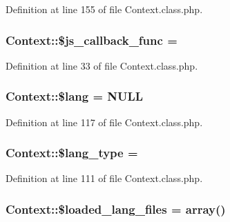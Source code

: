 Definition at line 155 of file Context.\+class.\+php.

\hypertarget{classContext_afddd5e6374a20b88466dfd1cb6f32d62}{}
\subsubsection[{\$js\+\_\+callback\+\_\+func}]{\setlength{\rightskip}{0pt plus 5cm}Context\+::\$js\+\_\+callback\+\_\+func = \textquotesingle{}\textquotesingle{}}\label{classContext_afddd5e6374a20b88466dfd1cb6f32d62}


Definition at line 33 of file Context.\+class.\+php.

\hypertarget{classContext_a0771720dad655d0c53f6f31066c67a40}{}
\subsubsection[{\$lang}]{\setlength{\rightskip}{0pt plus 5cm}Context\+::\$lang = N\+U\+L\+L}\label{classContext_a0771720dad655d0c53f6f31066c67a40}


Definition at line 117 of file Context.\+class.\+php.

\hypertarget{classContext_a170ac1b95c16b53af329395df9376e9f}{}
\subsubsection[{\$lang\+\_\+type}]{\setlength{\rightskip}{0pt plus 5cm}Context\+::\$lang\+\_\+type = \textquotesingle{}\textquotesingle{}}\label{classContext_a170ac1b95c16b53af329395df9376e9f}


Definition at line 111 of file Context.\+class.\+php.

\hypertarget{classContext_a0a199fec60b92b21746f1b6e93df01dc}{}
\subsubsection[{\$loaded\+\_\+lang\+\_\+files}]{\setlength{\rightskip}{0pt plus 5cm}Context\+::\$loaded\+\_\+lang\+\_\+files = array()}\label{classContext_a0a199fec60b92b21746f1b6e93df01dc}


